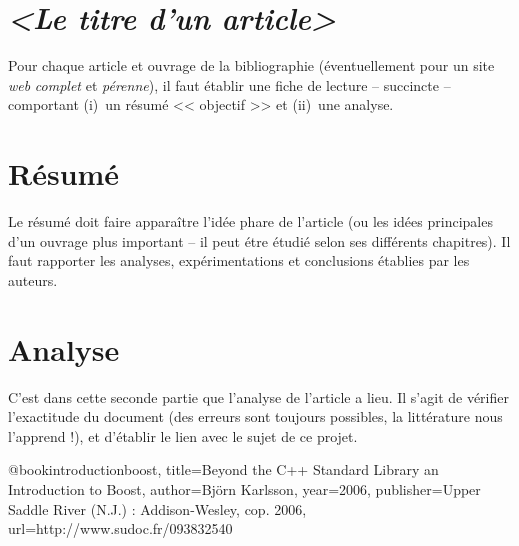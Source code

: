 \documentclass[a4paper,11pt]{report}
\begin{document}
\section{\emph{<Le titre d'un article>}}

Pour chaque article et ouvrage de la bibliographie (éventuellement pour un site \emph{web} \emph{complet} et \emph{pérenne}), il faut établir une fiche de lecture -- succincte -- comportant (i)~un résumé << objectif >> et (ii)~une analyse.

\section{Résumé}

Le résumé doit faire apparaître l'idée phare de l'article (ou les idées principales d'un ouvrage plus important -- il peut étre étudié selon ses différents chapitres). Il faut rapporter les analyses, expérimentations et conclusions établies par les auteurs.

\section{Analyse}

C'est dans cette seconde partie que l'analyse de l'article a lieu. Il s'agit de vérifier l'exactitude du document (des erreurs sont toujours possibles, la littérature nous l'apprend !), et d'établir le lien avec le sujet de ce projet.


@book{introductionboost,
title={Beyond the C++ Standard Library an Introduction to Boost},
author={Björn Karlsson},
  year={2006},
  publisher={Upper Saddle River (N.J.) : Addison-Wesley, cop. 2006},
	url={http://www.sudoc.fr/093832540}
}
\end{document}
